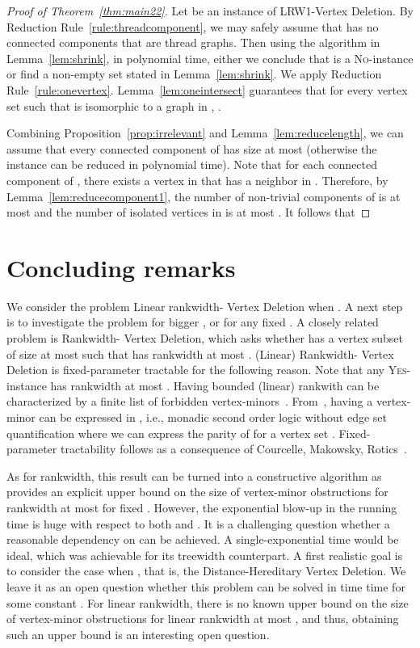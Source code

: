 \documentclass[11pt]{article}
\theoremstyle{remark}
\newcommand{\NO}{\textsc{No}}
\begin{document}
\begin{proof}[Proof of Theorem~\ref{thm:main22}]
  Let  be an instance of {\sc LRW1-Vertex Deletion}. 
  By Reduction Rule~\ref{rule:threadcomponent}, we may safely assume that  has no connected components that are thread graphs. 
  Then using the algorithm in Lemma~\ref{lem:shrink}, in polynomial time, either we conclude that  is a \NO-instance or find a non-empty set  stated in Lemma~\ref{lem:shrink}.
  We apply Reduction Rule~\ref{rule:onevertex}.
Lemma~\ref{lem:oneintersect} guarantees that for every vertex set  such that  is isomorphic to a graph in , . 

Combining Proposition~\ref{prop:irrelevant} and  Lemma~\ref{lem:reducelength}, we can assume that every connected component of  has size at most   (otherwise the instance can be reduced in polynomial time). 
Note that for each connected component  of , there exists a vertex in  that has a neighbor in . Therefore, by Lemma~\ref{lem:reducecomponent1}, the number of non-trivial components of  is at most  and
the number of isolated vertices in  is at most .
It follows that

\end{proof}
\section{Concluding remarks}\label{sec:remark}

 

We consider the problem {\sc Linear rankwidth- Vertex Deletion} when . A next step is to investigate the problem for bigger , or for any fixed . A closely related problem is {\sc Rankwidth- Vertex Deletion}, which asks whether  has a vertex subset of size at most  such that  has rankwidth at most . {\sc (Linear) Rankwidth- Vertex Deletion} is fixed-parameter tractable for the following reason. Note that any \textsc{Yes}-instance has rankwidth at most . Having bounded (linear) rankwith can be characterized by a finite list of forbidden vertex-minors~\cite{Oum05}. From~\cite{CO2007}, having a vertex-minor can be expressed in , i.e., monadic second order logic without edge set quantification where we can express the parity of  for a vertex set . Fixed-parameter tractability follows as a consequence of Courcelle, Makowsky, Rotics~\cite{CourcelleMR00}. 

As for rankwidth, this result can be turned into a constructive algorithm as~\cite{Oum05} provides an explicit upper bound on the size of vertex-minor obstructions for rankwidth at most  for fixed . 
However, the exponential blow-up in the running time is huge with respect to both  and . It is a challenging question whether a reasonable dependency on  can be achieved. A single-exponential time would be ideal, which was achievable for its treewidth counterpart. A first realistic goal is to consider the case when , that is, the {\sc Distance-Hereditary Vertex Deletion}. We leave it as an open question whether this problem can be solved in time   time for some constant . For linear rankwidth, there is no known upper bound on the size of vertex-minor obstructions for linear rankwidth at most , and thus, obtaining such an upper bound is an interesting open question. 
\end{document}
